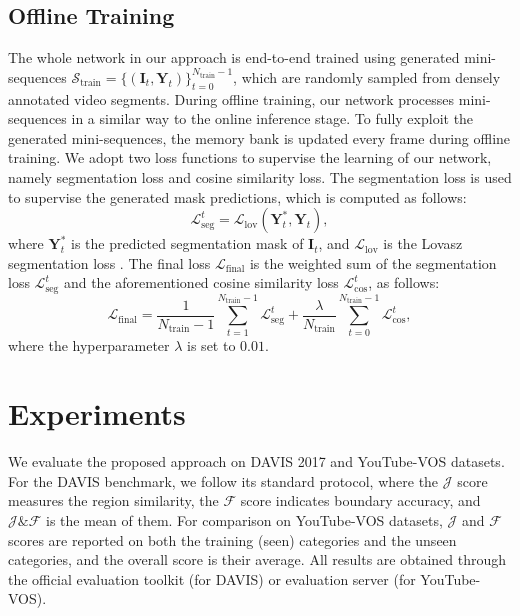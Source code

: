 \documentclass[10pt,twocolumn,letterpaper]{article}
\begin{document}
\subsection{Offline Training}\label{subsection:training}
The whole network in our approach is end-to-end trained using generated mini-sequences $\mathcal{S}_{\text{train}} = \{(\mathbf{I}_t, \mathbf{Y}_t)\}_{t=0}^{N_{\text{train}}-1}$, which are randomly sampled from densely annotated video segments.
During offline training, our network processes mini-sequences in a similar way to the online inference stage. To fully exploit the generated mini-sequences, the memory bank is updated every frame during offline training. We adopt two loss functions to supervise the learning of our network, namely segmentation loss and cosine similarity loss. The segmentation loss is used to supervise the generated mask predictions, which is computed as follows:
\begin{equation}
	\mathcal{L}_{\text{seg}}^t =\mathcal{L}_{\text{lov}} \left(\mathbf{Y}_t^*, \mathbf{Y}_t\right),
\end{equation}
where $\mathbf{Y}_t^*$ is the predicted segmentation mask of $\mathbf{I}_t$, and $\mathcal{L}_{\text{lov}}$ is the Lovasz segmentation loss \cite{Lovasz2018A}. The final loss $\mathcal{L}_{\text{final}}$ is the weighted sum of the segmentation loss $\mathcal{L}_{\text{seg}}^t$ and the aforementioned cosine similarity loss $\mathcal{L}_{\text{cos}}^t$, as follows:
\begin{equation}
	\mathcal{L}_{\text{final}} =  
	\frac{1}{N_{\text{train}}-1} \sum\limits_{t=1}^{N_{\text{train}}-1} \mathcal{L}_{\text{seg}}^t
	+
	\frac{\lambda}{N_{\text{train}}} \sum\limits_{t=0}^{N_{\text{train}}-1}
	\mathcal{L}_{\text{cos}}^t
	,
\end{equation}
where the hyperparameter $\lambda$ is set to $0.01$.

\section{Experiments}
We evaluate the proposed approach on DAVIS 2017 \cite{DAVIS2017} and YouTube-VOS \cite{Xu2018YouTubeVOSAL} datasets. For the DAVIS benchmark, we follow its standard protocol, where the $\mathcal{J}$ score measures the region similarity, the $\mathcal{F}$ score indicates boundary accuracy, and $\mathcal{J} \& \mathcal{F}$ is the mean of them. For comparison on YouTube-VOS datasets, $\mathcal{J}$ and $\mathcal{F}$ scores are reported on both the training (seen) categories and the unseen categories, and the overall score is their average. All results are obtained through the official evaluation toolkit (for DAVIS) or evaluation server (for YouTube-VOS).
\end{document}
